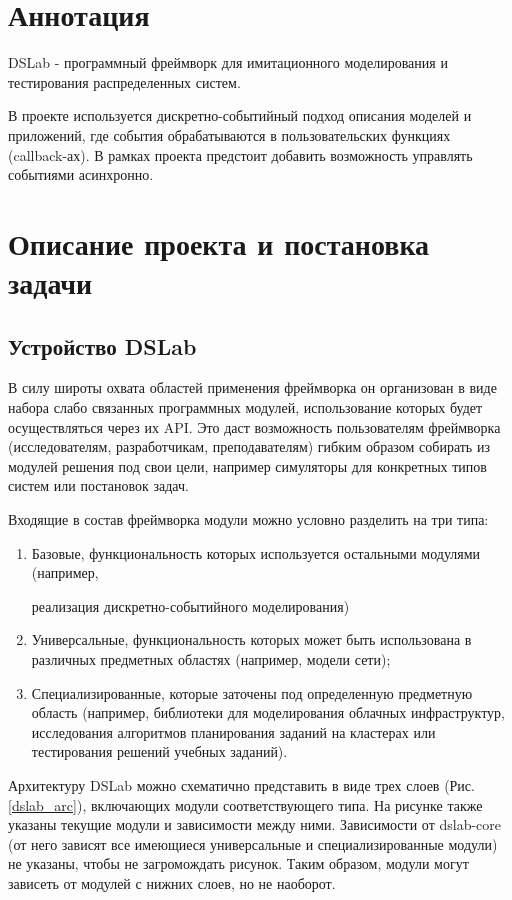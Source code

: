 

\section*{Аннотация}

DSLab - программный фреймворк для имитационного моделирования и тестирования распределенных систем.

В проекте используется дискретно-событийный подход описания моделей и приложений, где события обрабатываются в пользовательских функциях (callback-ах). В рамках проекта предстоит добавить возможность управлять событиями асинхронно.


\section{Описание проекта и постановка задачи}

\subsection{Устройство DSLab}

В силу широты охвата областей применения фреймворка он организован в виде набора слабо связанных программных модулей, использование которых будет осуществляться через их API. Это даст возможность пользователям фреймворка (исследователям, разработчикам, преподавателям) гибким образом собирать из модулей решения под свои цели, например симуляторы для конкретных типов систем или постановок задач.

Входящие в состав фреймворка модули можно условно разделить на три типа:
\begin{enumerate}
    \item 
    Базовые, функциональность которых используется остальными модулями (например, 
    
    реализация дискретно-событийного моделирования)
    \item
    Универсальные, функциональность которых может быть использована в различных предметных областях (например, модели сети);
    \item
    Специализированные, которые заточены под определенную предметную область (например, библиотеки для моделирования облачных инфраструктур, исследования алгоритмов планирования заданий на кластерах или тестирования решений учебных заданий).
\end{enumerate}

Архитектуру DSLab можно схематично представить в виде трех слоев (Рис. \ref{dslab_arc}), включающих модули соответствующего типа. На рисунке также указаны текущие модули и зависимости между ними. Зависимости от dslab-core (от него зависят все имеющиеся универсальные и специализированные модули) не указаны, чтобы не загромождать рисунок. Таким образом, модули могут зависеть от модулей с нижних слоев, но не наоборот.

